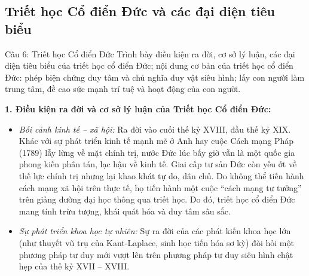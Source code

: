 \documentclass[12pt,a4paper]{article}
\begin{document}
\subsection{Triết học Cổ điển Đức và các đại diện tiêu biểu}

\begin{questionbox}{Câu 6: Triết học Cổ điển Đức}
Trình bày điều kiện ra đời, cơ sở lý luận, các đại diện tiêu biểu của triết học cổ điển Đức; nội dung cơ bản của triết học cổ điển Đức: phép biện chứng duy tâm và chủ nghĩa duy vật siêu hình; lấy con người làm trung tâm, đề cao sức mạnh trí tuệ và hoạt động của con người.
\end{questionbox}

\noindent
\textbf{1. Điều kiện ra đời và cơ sở lý luận của Triết học Cổ điển Đức:}
\begin{itemize}
    \item \textit{Bối cảnh kinh tế -- xã hội:} Ra đời vào cuối thế kỷ XVIII, đầu thế kỷ XIX. Khác với sự phát triển kinh tế mạnh mẽ ở Anh hay cuộc Cách mạng Pháp (1789) lẫy lừng về mặt chính trị, nước Đức lúc bấy giờ vẫn là một quốc gia phong kiến phân tán, lạc hậu về kinh tế. Giai cấp tư sản Đức còn yếu ớt về thế lực chính trị nhưng lại khao khát tự do, dân chủ. Do không thể tiến hành cách mạng xã hội trên thực tế, họ tiến hành một cuộc ``cách mạng tư tưởng'' trên giảng đường đại học thông qua triết học. Do đó, triết học cổ điển Đức mang tính trừu tượng, khái quát hóa và duy tâm sâu sắc.
    \item \textit{Sự phát triển khoa học tự nhiên:} Sự ra đời của các phát kiến khoa học lớn (như thuyết vũ trụ của Kant-Laplace, sinh học tiến hóa sơ kỳ) đòi hỏi một phương pháp tư duy mới vượt lên trên phương pháp tư duy siêu hình chật hẹp của thế kỷ XVII -- XVIII.
\end{itemize}
\end{document}
